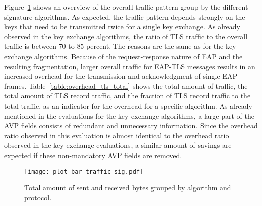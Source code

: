 Figure~\ref{fig:plot_bar_traffic_sig.pdf} shows an overview of the overall traffic pattern group by the different signature algorithms. As expected, the traffic pattern depends strongly on the keys that need to be transmitted twice for a single key exchange. As already observed in the key exchange algorithms, the ratio of TLS traffic to the overall traffic is between \(70\) to \(85\) percent. The reasons are the same as for the key exchange algorithms. Because of the request-response nature of \ac{EAP} and the resulting fragmentation, larger overall traffic for EAP-TLS messages results in an increased overhead for the transmission and acknowledgment of single \ac{EAP} frames. Table~\ref{table:overhead_tls_total} shows the total amount of traffic, the total amount of TLS record traffic, and the fraction of TLS record traffic to the total traffic, as an indicator for the overhead for a specific algorithm. As already mentioned in the evaluations for the key exchange algorithms, a large part of the AVP fields consists of redundant and unnecessary information. Since the overhead ratio observed in this evaluation is almost identical to the overhead ratio observed in the key exchange evaluations, a similar amount of savings are expected if these non-mandatory AVP fields are removed.

\begin{figure}[t]
    \centering\texttt{[image: plot\_bar\_traffic\_sig.pdf]}
    \caption{Total amount of sent and received bytes grouped by algorithm and protocol.}\label{fig:plot_bar_traffic_sig.pdf}
\end{figure}


